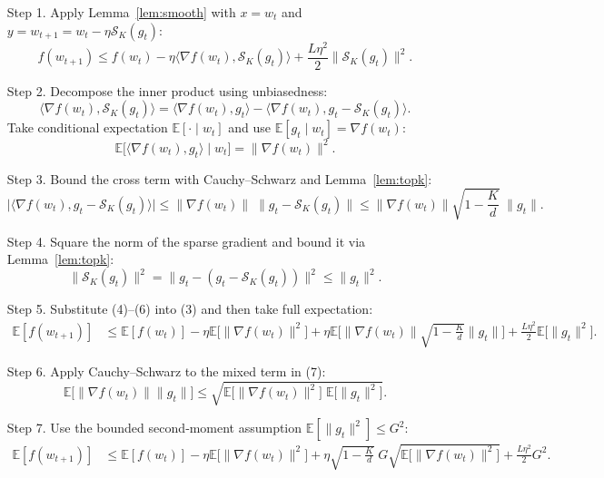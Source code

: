 \documentclass{article}
\newcommand{\E}{\mathbb{E}}
\newcommand{\topk}{\mathcal{S}_K}
\begin{document}
\begin{enumerate}
\item[Step 1.] Apply Lemma~\ref{lem:smooth} with $x=w_{t}$ and $y=w_{t+1}=w_{t}-\eta\topk(g_{t})$:
\[
f(w_{t+1})\le f(w_{t})-\eta\langle\nabla f(w_{t}),\topk(g_{t})\rangle+\frac{L\eta^{2}}{2}\|\topk(g_{t})\|^{2}. \tag{3}
\]

\item[Step 2.] Decompose the inner product using unbiasedness:
\[
\langle\nabla f(w_{t}),\topk(g_{t})\rangle
= \langle\nabla f(w_{t}),g_{t}\rangle-\langle\nabla f(w_{t}),g_{t}-\topk(g_{t})\rangle.
\]
Take conditional expectation $\E[\cdot\mid w_{t}]$ and use $\E[g_{t}\mid w_{t}]=\nabla f(w_{t})$:
\[
\E\big[\langle\nabla f(w_{t}),g_{t}\rangle\mid w_{t}\big]=\|\nabla f(w_{t})\|^{2}. \tag{4}
\]

\item[Step 3.] Bound the cross term with Cauchy–Schwarz and Lemma~\ref{lem:topk}:
\[
\big|\langle\nabla f(w_{t}),g_{t}-\topk(g_{t})\rangle\big|
\le \|\nabla f(w_{t})\|\;\|g_{t}-\topk(g_{t})\|
\le \|\nabla f(w_{t})\|\sqrt{1-\frac{K}{d}}\;\|g_{t}\|. \tag{5}
\]

\item[Step 4.] Square the norm of the sparse gradient and bound it via Lemma~\ref{lem:topk}:
\[
\|\topk(g_{t})\|^{2}= \|g_{t}-(g_{t}-\topk(g_{t}))\|^{2}
\le \|g_{t}\|^{2}. \tag{6}
\]

\item[Step 5.] Substitute (4)–(6) into (3) and then take full expectation:
\[
\begin{aligned}
\E[f(w_{t+1})]
&\le \E[f(w_{t})]
-\eta\E\!\big[\|\nabla f(w_{t})\|^{2}\big]
+\eta\E\!\big[\|\nabla f(w_{t})\|\sqrt{1-\tfrac{K}{d}}\|g_{t}\|\big]
+\frac{L\eta^{2}}{2}\E\!\big[\|g_{t}\|^{2}\big].
\end{aligned} \tag{7}
\]

\item[Step 6.] Apply Cauchy–Schwarz to the mixed term in (7):
\[
\E\!\big[\|\nabla f(w_{t})\|\|g_{t}\|\big]
\le \sqrt{\E\!\big[\|\nabla f(w_{t})\|^{2}\big]\;\E\!\big[\|g_{t}\|^{2}\big]}.
\tag{8}
\]

\item[Step 7.] Use the bounded second‑moment assumption $\E[\|g_{t}\|^{2}]\le G^{2}$:
\[
\begin{aligned}
\E[f(w_{t+1})]
&\le \E[f(w_{t})]
-\eta\E\!\big[\|\nabla f(w_{t})\|^{2}\big]
+\eta\sqrt{1-\tfrac{K}{d}}\;G\sqrt{\E\!\big[\|\nabla f(w_{t})\|^{2}\big]}
+\frac{L\eta^{2}}{2}G^{2}.
\end{aligned} \tag{9}
\]


\end{enumerate}
\end{document}
